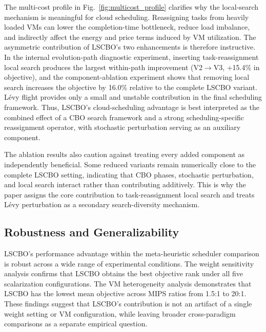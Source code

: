 \documentclass[pdflatex,onecolumn,sn-mathphys-num]{sn-jnl}
\begin{document}
The multi-cost profile in Fig.~\ref{fig:multicost_profile} clarifies why the local-search mechanism is meaningful for cloud scheduling. Reassigning tasks from heavily loaded VMs can lower the completion-time bottleneck, reduce load imbalance, and indirectly affect the energy and price terms induced by VM utilization. The asymmetric contribution of LSCBO's two enhancements is therefore instructive. In the internal evolution-path diagnostic experiment, inserting task-reassignment local search produces the largest within-path improvement (V2$\rightarrow$V3, +15.4\% in objective), and the component-ablation experiment shows that removing local search increases the objective by 16.0\% relative to the complete LSCBO variant. L\'{e}vy flight provides only a small and unstable contribution in the final scheduling framework. Thus, LSCBO's cloud-scheduling advantage is best interpreted as the combined effect of a CBO search framework and a strong scheduling-specific reassignment operator, with stochastic perturbation serving as an auxiliary component.

The ablation results also caution against treating every added component as independently beneficial. Some reduced variants remain numerically close to the complete LSCBO setting, indicating that CBO phases, stochastic perturbation, and local search interact rather than contributing additively. This is why the paper assigns the core contribution to task-reassignment local search and treats L\'{e}vy perturbation as a secondary search-diversity mechanism.

\subsection{Robustness and Generalizability}
LSCBO's performance advantage within the meta-heuristic scheduler comparison is robust across a wide range of experimental conditions. The weight sensitivity analysis confirms that LSCBO obtains the best objective rank under all five scalarization configurations. The VM heterogeneity analysis demonstrates that LSCBO has the lowest mean objective across MIPS ratios from 1.5:1 to 20:1. These findings suggest that LSCBO's contribution is not an artifact of a single weight setting or VM configuration, while leaving broader cross-paradigm comparisons as a separate empirical question.
\end{document}
